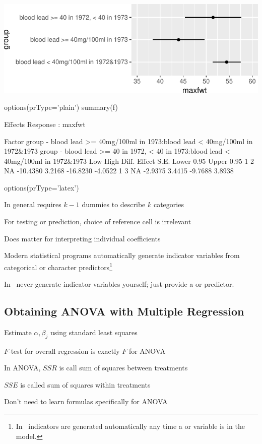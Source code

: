 \centerline{\includegraphics{reg-olslead-1} }


\begin{Schunk}
\begin{Sinput}
options(prType='plain')
summary(f)
\end{Sinput}
\begin{Soutput}
             Effects              Response : maxfwt 

 Factor                                                                             
 group - blood lead >= 40mg/100ml in 1973:blood lead < 40mg/100ml in 1972&1973      
 group - blood lead >= 40 in 1972, < 40 in 1973:blood lead < 40mg/100ml in 1972&1973
 Low High Diff. Effect   S.E.   Lower 0.95 Upper 0.95
 1   2    NA    -10.4380 3.2168 -16.8230   -4.0522   
 1   3    NA     -2.9375 3.4415  -9.7688    3.8938   
\end{Soutput}
\begin{Sinput}
options(prType='latex')
\end{Sinput}
\end{Schunk}
\bi
\item In general requires $k-1$ dummies to describe $k$ categories
\item For testing or prediction, choice of reference cell is
  irrelevant
\item Does matter for interpreting individual coefficients
\item Modern statistical programs automatically generate indicator
  variables from categorical or character predictors\footnote{In
    \R\ indicators are generated automatically any time a 
    or  variable is in the model.}
\item In \R\ never generate indicator variables yourself; just provide a  or  predictor.
\ei
\clearpage

\subsection{Obtaining ANOVA with Multiple Regression}
\bi
\item Estimate $\alpha, \beta_{j}$ using standard least squares
\item $F$-test for overall regression is exactly $F$ for ANOVA
\item In ANOVA, $SSR$ is call sum of squares between treatments
\item $SSE$ is called sum of squares within treatments
\item Don't need to learn formulas specifically for ANOVA
\ei

